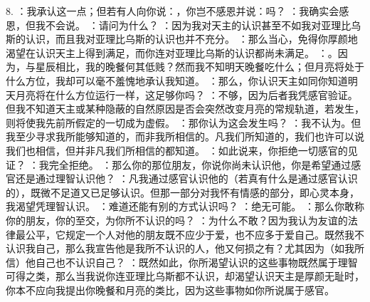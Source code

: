 8. ：我承认这一点；但若有人向你说：，你岂不感恩并说：吗？\newline{} ：我确实会感恩，但我不会说。\newline{} ：请问为什么？\newline{} ：因为我对天主的认识甚至不如我对亚理比乌斯的认识，而且我对亚理比乌斯的认识也并不充分。\newline{} ：那么当心，免得你厚颜地渴望在认识天主上得到满足，而你连对亚理比乌斯的认识都尚未满足。\newline{} ：。因为，与星辰相比，我的晚餐何其低贱？然而我不知明天晚餐吃什么；但月亮将处于什么方位，我却可以毫不羞愧地承认我知道。\newline{} ：那么，你认识天主如同你知道明天月亮将在什么方位运行一样，这足够你吗？\newline{} ：不够，因为后者我凭感官验证。但我不知道天主或某种隐蔽的自然原因是否会突然改变月亮的常规轨道，若发生，则将使我先前所假定的一切成为虚假。\newline{} ：那你认为这会发生吗？\newline{} ：我不认为。但我至少寻求我所能够知道的，而非我所相信的。凡我们所知道的，我们也许可以说我们也相信，但并非凡我们所相信的都知道。\newline{} ：如此说来，你拒绝一切感官的见证？\newline{} ：我完全拒绝。\newline{} ：那么你的那位朋友，你说你尚未认识他，你是希望通过感官还是通过理智认识他？\newline{} ：凡我通过感官认识他的（若真有什么是通过感官认识的），既微不足道又已足够认识。但那一部分对我怀有情感的部分，即心灵本身，我渴望凭理智认识。\newline{} ：难道还能有别的方式认识吗？\newline{} ：绝无可能。\newline{} ：那么你敢称你的朋友，你的至交，为你所不认识的吗？\newline{} ：为什么不敢？因为我认为友谊的法律最公平，它规定一个人对他的朋友既不应少于爱，也不应多于爱自己。既然我不认识我自己，那么我宣告他是我所不认识的人，他又何损之有？尤其因为（如我所信）他自己也不认识自己？\newline{} ：既然如此，你所渴望认识的这些事物既然属于理智可得之类，那么当我说你连亚理比乌斯都不认识，却渴望认识天主是厚颜无耻时，你本不应向我提出你晚餐和月亮的类比，因为这些事物如你所说属于感官。\par

